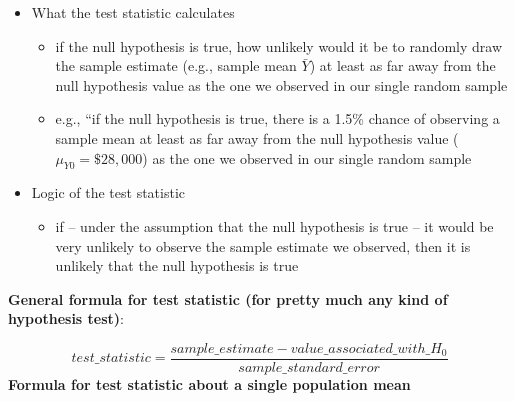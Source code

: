 \documentclass[
  letterpaper,
  DIV=11,
  numbers=noendperiod]{scrartcl}
\providecommand{\tightlist}{%
  \setlength{\itemsep}{0pt}\setlength{\parskip}{0pt}}\usepackage{longtable,booktabs,array}
\begin{document}
\begin{itemize}
\tightlist
\item
  What the test statistic calculates

  \begin{itemize}
  \tightlist
  \item
    if the null hypothesis is true, how unlikely would it be to randomly
    draw the sample estimate (e.g., sample mean \(\bar{Y}\)) at least as
    far away from the null hypothesis value as the one we observed in
    our single random sample
  \item
    e.g., ``if the null hypothesis is true, there is a 1.5\% chance of
    observing a sample mean at least as far away from the null
    hypothesis value (\(\mu_{Y0} = \$28,000\)) as the one we observed in
    our single random sample
  \end{itemize}
\item
  Logic of the test statistic

  \begin{itemize}
  \tightlist
  \item
    if -- under the assumption that the null hypothesis is true -- it
    would be very unlikely to observe the sample estimate we observed,
    then it is unlikely that the null hypothesis is true
  \end{itemize}
\end{itemize}

\textbf{General formula for test statistic (for pretty much any kind of
hypothesis test)}:

\[ test\_statistic = \frac{sample\_estimate - value\_associated\_with\_H_0}{sample\_standard\_error}\]
\textbf{Formula for test statistic about a single population mean}
\end{document}
